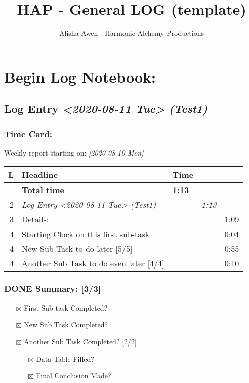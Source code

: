 \documentclass[11pt]{article}
\author{Alisha Awen - Harmonic Alchemy Productions}
\date{}
\title{HAP - General LOG (template)}
\begin{document}
\maketitle
\setlength\parindent{0pt}

\section*{Begin Log Notebook:}
\label{sec:orgb0bf5d6}
\subsection*{Log Entry \textit{<2020-08-11 Tue> } \emph{(Test1)}}
\label{sec:org91f597a}
\subsubsection*{Time Card:}
\label{sec:org6032d35}



Weekly report starting on: \textit{[2020-08-10 Mon]}\\
\begin{center}
\begin{tabular}{rlllr}
L & Headline & Time &  & \\
\hline
 & \textbf{Total time} & \textbf{1:13} &  & \\
\hline
2 & \hspace*{1.0em}\emph{Log Entry \textit{<2020-08-11 Tue> } \emph{(Test1)}} &  & \emph{1:13} & \\
3 & \hspace*{2.0em}Details: &  &  & 1:09\\
4 & \hspace*{3.0em}Starting Clock on this first sub-task &  &  & 0:04\\
4 & \hspace*{3.0em}New Sub Task to do later [5/5] &  &  & 0:55\\
4 & \hspace*{3.0em}Another Sub Task to do even later [4/4] &  &  & 0:10\\
\end{tabular}
\end{center}

\subsubsection*{{\bfseries\sffamily DONE} Summary: [3/3]}
\label{sec:orgd6006a0}
\begin{enumerate}
\item[{$\boxtimes$}] First Sub-task Completed?\\
\item[{$\boxtimes$}] New Sub Task Completed?\\
\item[{$\boxtimes$}] Another Sub Task Completed? [2/2]\\
\begin{itemize}
\item[{$\boxtimes$}] Data Table Filled?\\
\item[{$\boxtimes$}] Final Conclusion Made?\\
\end{itemize}
\end{enumerate}
\end{document}
